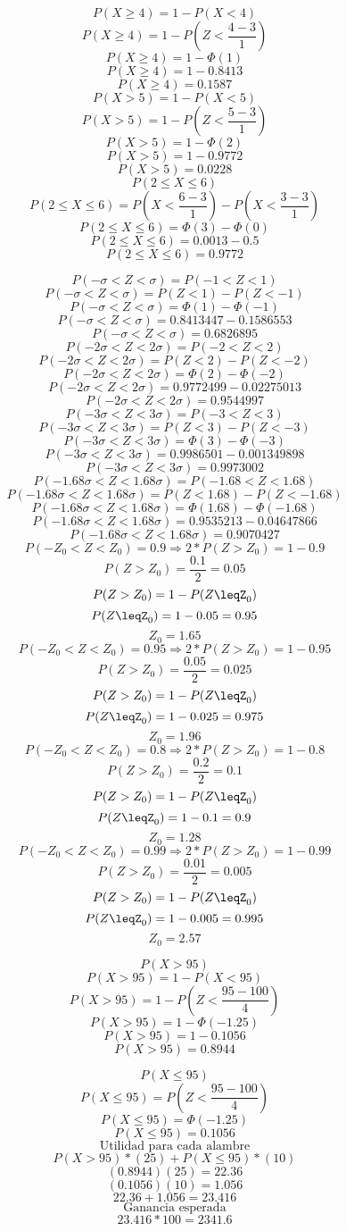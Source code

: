 $$P(X\geq4)=1-P(X<4)$$
$$P(X\geq4)=1-P(Z<\frac{4-3}{1})$$
$$P(X\geq4)=1-\Phi(1)$$
$$P(X\geq4)=1-0.8413$$
$$P(X\geq4)=0.1587$$
$$P(X>5)=1-P(X<5)$$
$$P(X>5)=1-P(Z<\frac{5-3}{1})$$
$$P(X>5)=1-\Phi(2)$$
$$P(X>5)=1-0.9772$$
$$P(X>5)=0.0228$$
$$P(2\leq X \leq6)$$
$$P(2\leq X \leq6)=P(X<\frac{6-3}{1})-P(X<\frac{3-3}{1})$$
$$P(2\leq X \leq6)=\Phi(3)-\Phi(0)$$
$$P(2\leq X \leq6)=0.0013-0.5$$
$$P(2\leq X \leq6)=0.9772$$

$$P(-\sigma<Z<\sigma)=P(-1<Z<1)$$
$$P(-\sigma<Z<\sigma)=P(Z<1)-P(Z<-1)$$
$$P(-\sigma<Z<\sigma)=\Phi(1)-\Phi(-1)$$
$$P(-\sigma<Z<\sigma)=0.8413447-0.1586553$$
$$P(-\sigma<Z<\sigma)=0.6826895$$
$$P(-2\sigma<Z<2\sigma)=P(-2<Z<2)$$
$$P(-2\sigma<Z<2\sigma)=P(Z<2)-P(Z<-2)$$
$$P(-2\sigma<Z<2\sigma)=\Phi(2)-\Phi(-2)$$
$$P(-2\sigma<Z<2\sigma)=0.9772499-0.02275013$$
$$P(-2\sigma<Z<2\sigma)=0.9544997$$
$$P(-3\sigma<Z<3\sigma)=P(-3<Z<3)$$
$$P(-3\sigma<Z<3\sigma)=P(Z<3)-P(Z<-3)$$
$$P(-3\sigma<Z<3\sigma)=\Phi(3)-\Phi(-3)$$
$$P(-3\sigma<Z<3\sigma)=0.9986501-0.001349898$$
$$P(-3\sigma<Z<3\sigma)=0.9973002$$
$$P(-1.68\sigma<Z<1.68\sigma)=P(-1.68<Z<1.68)$$
$$P(-1.68\sigma<Z<1.68\sigma)=P(Z<1.68)-P(Z<-1.68)$$
$$P(-1.68\sigma<Z<1.68\sigma)=\Phi(1.68)-\Phi(-1.68)$$
$$P(-1.68\sigma<Z<1.68\sigma)=0.9535213-0.04647866$$
$$P(-1.68\sigma<Z<1.68\sigma)=0.9070427$$
$$P(-Z_{0}<Z<Z_{0})=0.9\Rightarrow2*P(Z>Z_{0})=1-0.9$$
$$P(Z>Z_{0})=\frac{0.1}{2}=0.05$$
$$P(Z>Z_{0})=1-P(Z\leqZ_{0})$$
$$P(Z\leqZ_{0})=1-0.05=0.95$$
$$Z_{0}=1.65$$
$$P(-Z_{0}<Z<Z_{0})=0.95\Rightarrow2*P(Z>Z_{0})=1-0.95$$
$$P(Z>Z_{0})=\frac{0.05}{2}=0.025$$
$$P(Z>Z_{0})=1-P(Z\leqZ_{0})$$
$$P(Z\leqZ_{0})=1-0.025=0.975$$
$$Z_{0}=1.96$$
$$P(-Z_{0}<Z<Z_{0})=0.8\Rightarrow2*P(Z>Z_{0})=1-0.8$$
$$P(Z>Z_{0})=\frac{0.2}{2}=0.1$$
$$P(Z>Z_{0})=1-P(Z\leqZ_{0})$$
$$P(Z\leqZ_{0})=1-0.1=0.9$$
$$Z_{0}=1.28$$
$$P(-Z_{0}<Z<Z_{0})=0.99\Rightarrow2*P(Z>Z_{0})=1-0.99$$
$$P(Z>Z_{0})=\frac{0.01}{2}=0.005$$
$$P(Z>Z_{0})=1-P(Z\leqZ_{0})$$
$$P(Z\leqZ_{0})=1-0.005=0.995$$
$$Z_{0}=2.57$$

$$P(X>95)$$
$$P(X>95)=1-P(X<95)$$
$$P(X>95)=1-P(Z<\frac{95-100}{4})$$
$$P(X>95)=1-\Phi(-1.25)$$
$$P(X>95)=1-0.1056$$
$$P(X>95)=0.8944$$

$$P(X\leq95)$$
$$P(X\leq95)=P(Z<\frac{95-100}{4})$$
$$P(X\leq95)=\Phi(-1.25)$$
$$P(X\leq95)=0.1056$$
$$\mbox{Utilidad para cada alambre}$$
$$P(X>95)*(25)+P(X\leq95)*(10)$$
$$(0.8944)(25)=22.36$$
$$(0.1056)(10)=1.056$$
$$22.36+1.056=23.416$$
$$\mbox{Ganancia esperada}$$
$$23.416*100=2341.6$$

